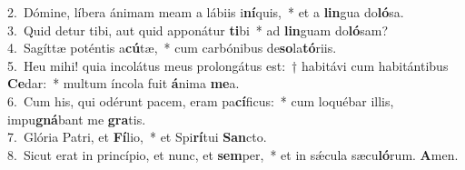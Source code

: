 {2.~}Dómine, líbera ánimam meam a lábiis i\textbf{ní}quis,~* et a \textbf{lin}gua do\textbf{ló}sa.\\
{3.~}Quid detur tibi, aut quid apponátur \textbf{ti}bi~* ad \textbf{lin}guam do\textbf{ló}sam?\\
{4.~}Sagíttæ poténtis a\textbf{cú}tæ,~* cum carbónibus de\textbf{so}la\textbf{tó}riis.\\
{5.~}Heu mihi! quia incolátus meus prolongátus est:~† habitávi cum habitántibus \textbf{Ce}dar:~* multum íncola fuit \textbf{á}nima \textbf{me}a.\\
{6.~}Cum his, qui odérunt pacem, eram pa\textbf{cí}ficus:~* cum loquébar illis, impu\textbf{gná}bant me \textbf{gra}tis.\\
{7.~}Glória Patri, et \textbf{Fí}lio,~* et Spi\textbf{rí}tui \textbf{San}cto.\\
{8.~}Sicut erat in princípio, et nunc, et \textbf{sem}per,~* et in sǽcula sæcu\textbf{ló}rum. \textbf{A}men.\\
